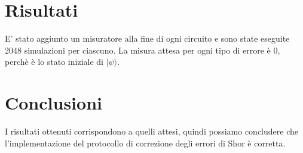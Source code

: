 \documentclass[12pt, a4paper]{article}
\newcommand{\ket}[1]{| #1 \rangle}
\begin{document}
\section*{Risultati}
E' stato aggiunto un misuratore alla fine di ogni circuito e sono state eseguite 2048 simulazioni per ciascuno. La misura attesa per ogni tipo di errore è 0, perchè è lo stato iniziale di $\ket{\psi}$.

\section*{Conclusioni}
I risultati ottenuti corrispondono a quelli attesi, quindi possiamo concludere che l'implementazione del protocollo di correzione degli errori di Shor è corretta.
\end{document}
